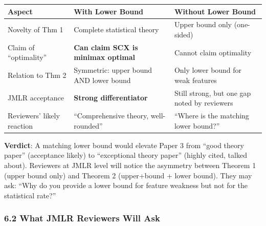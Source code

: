 \documentclass[
  12pt,
]{article}
\begin{document}
\begin{longtable}[]{@{}
  >{\raggedright\arraybackslash}p{}
  >{\raggedright\arraybackslash}p{}
  >{\raggedright\arraybackslash}p{}@{}}
\toprule\noalign{}
\begin{minipage}[b]{\linewidth}\raggedright
Aspect
\end{minipage} & \begin{minipage}[b]{\linewidth}\raggedright
With Lower Bound
\end{minipage} & \begin{minipage}[b]{\linewidth}\raggedright
Without Lower Bound
\end{minipage} \\
\midrule\noalign{}
\endhead
\bottomrule\noalign{}
\endlastfoot
Novelty of Thm 1 & Complete statistical theory & Upper bound only
(one-sided) \\
Claim of ``optimality'' & \textbf{Can claim SCX is minimax optimal} &
Cannot claim optimality \\
Relation to Thm 2 & Symmetric: upper bound AND lower bound & Only lower
bound for weak features \\
JMLR acceptance & \textbf{Strong differentiator} & Still strong, but one
gap noted by reviewers \\
Reviewers' likely reaction & ``Comprehensive theory, well-rounded'' &
``Where is the matching lower bound?'' \\
\end{longtable}

\textbf{Verdict}: A matching lower bound would elevate Paper 3 from
``good theory paper'' (acceptance likely) to ``exceptional theory
paper'' (highly cited, talked about). Reviewers at JMLR level will
notice the asymmetry between Theorem 1 (upper bound only) and Theorem 2
(upper+bound + lower bound). They may ask: ``Why do you provide a lower
bound for feature weakness but not for the statistical rate?''

\subsubsection{6.2 What JMLR Reviewers Will
Ask}\label{what-jmlr-reviewers-will-ask}
\end{document}
